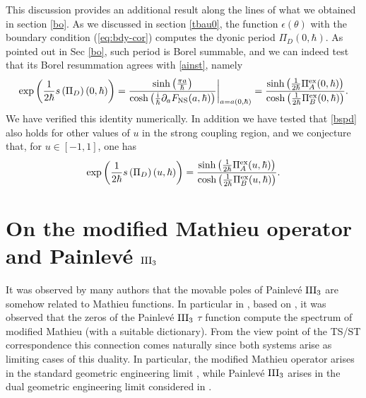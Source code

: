 \documentclass[a4paper,11pt]{article}
\theoremstyle{definition}
\newcommand{\ri}{{\rm i}}
\newcommand{\be}{\begin{equation}}
\newcommand{\ee}{\end{equation}}
\def\aaa#1{$\clubsuit$ \emph{\textcolor{orange}{#1}}
  $\clubsuit$}  %
\begin{document}
This discussion provides an additional result along the lines of what we obtained in section \ref{bo}. As we discussed in section 
\ref{tbau0}, the function $\epsilon(\theta)$ with the boundary condition (\ref{eq:bdy-cor}) computes the dyonic  period $\Pi_D(0,\hbar)$. As pointed out in Sec \ref{bo}, 
such period is Borel summable, and we can indeed test that its Borel resummation agrees with \eqref{ainst}, 
namely
%
\be  \label{bspd}\exp\left({1 \over 2 \hbar} s\left(\Pi_D\right)(0,\hbar)\right)={\sinh\left(\frac{\pi a}{\hbar }\right) \over \cosh\left({\ri \over \hbar}\partial_{a}F_{\rm NS}(a, \hbar)\right)}\bigg|_{a=a(0, \hbar)}=\frac{\sinh\left(\frac{1}{2 \hbar}  \Pi_A^{\rm ex}(0, \hbar)\right) }{ \cosh\left({1 \over 2\hbar} \Pi_B^{\rm ex}(0, \hbar)\right)}.
\ee
%
We have verified this identity numerically. In addition we have tested that \eqref{bspd} also holds for other values of $u$ in the strong coupling region, and we 
conjecture that, for $u\in [-1, 1]$, one has 
%
\be
 \label{bspd2}\exp\left({1 \over 2 \hbar} s\left(\Pi_D\right)(u,\hbar)\right)=\frac{\sinh\left(\frac{1}{2 \hbar}  \Pi_A^{\rm ex}(u, \hbar)\right) }{ \cosh\left({1 \over 2\hbar} \Pi_B^{\rm ex}(u, \hbar)\right)}.
\ee
%

\section{On the modified Mathieu operator and Painlev\'e $\rm III_3$}
\label{mathieu-painleve}
It was observed by many authors \cite{Lukyanov:2011wd, PCL, nok} that
the movable poles of Painlev\'e $\rm III_3$ are somehow related to
Mathieu functions. In particular in \cite{ sciarappa2}, based on
\cite{bgt}, it was observed that the zeros of the Painlev\'e
$\rm III_3$ $\tau$ function compute the spectrum of modified Mathieu
(with a suitable dictionary).  From the view point of the TS/ST
correspondence \cite{ghm} this connection comes naturally since both
systems arise as limiting cases of this duality.  In particular, the
modified Mathieu operator arises in the standard geometric engineering
limit \cite{hm,gm17,gm3}, while Painlev\'e $\rm III_3$ arises in the
dual geometric engineering limit considered in \cite{bgt}.
%
\end{document}
